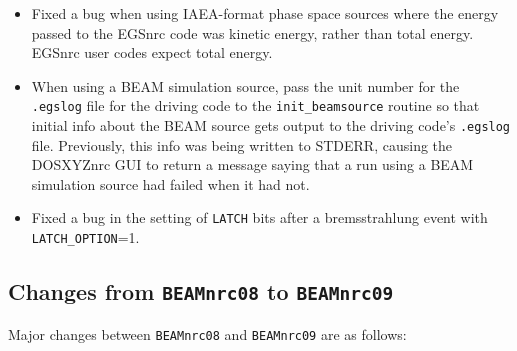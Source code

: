 \documentclass[12pt,twoside]{article}
\begin{document}
\begin{itemize}
\item Fixed a bug when using IAEA-format phase space sources where
the energy passed to the EGSnrc code was kinetic energy, rather than total
energy.  EGSnrc user codes expect total energy.

\item When using a BEAM simulation source, pass the unit number for the
{\tt .egslog} file for the driving code to the {\tt init\_beamsource}
routine so that initial info about the BEAM source gets output to the
driving code's {\tt .egslog} file.  Previously, this info was being written
to STDERR, causing the DOSXYZnrc GUI to return a message saying that a run using a BEAM simulation
source had failed when it had not.

\item Fixed a bug in the setting of {\tt LATCH} bits after a bremsstrahlung event
with {\tt LATCH\_OPTION}=1.

\end{itemize}

\subsection{Changes from {\tt BEAMnrc08} to {\tt BEAMnrc09}}

Major changes between {\tt BEAMnrc08} and {\tt BEAMnrc09} are
as follows:
\end{document}
